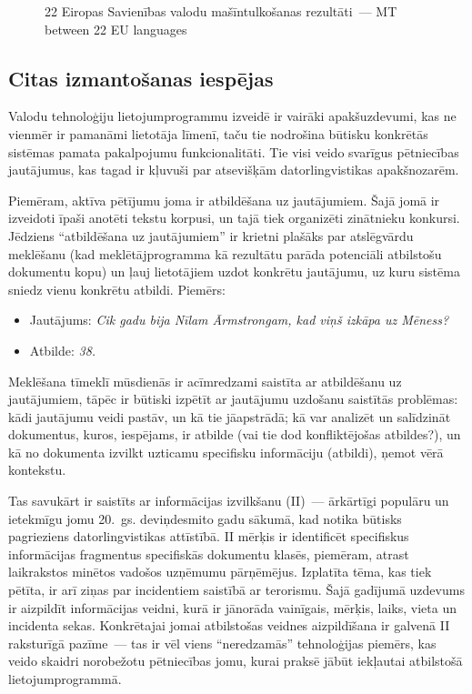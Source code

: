 \begin{multicols}{2}
\begin{figure}[htbp]
\begin{tabular}{>{\columncolor{corange1}}cccccccccccccccccccccccc}
    \end{tabular}
  \caption{22 Eiropas Savienības valodu mašīntulkošanas rezultāti~--- \textcolor{grey1}{MT between 22 EU languages}}
  \label{fig:euromatrix_po}
\end{figure}

\subsection{Citas izmantošanas iespējas}

Valodu tehnoloģiju lietojumprogrammu izveidē ir vairāki apakšuzdevumi, kas ne vienmēr ir pamanāmi lietotāja līmenī, taču tie nodrošina būtisku konkrētās sistēmas pamata pakalpojumu funkcionalitāti.
Tie visi veido svarīgus pētniecības jautājumus, kas tagad ir kļuvuši par atsevišķām datorlingvistikas apakš\-nozarēm. 

Piemēram, aktīva pētījumu joma ir atbildēšana uz jautājumiem.
Šajā jomā ir izveidoti īpaši anotēti tekstu korpusi, un tajā tiek organizēti zinātnieku konkursi. 
Jēdziens “atbildēšana uz jautājumiem” ir krietni plašāks par atslēgvārdu meklēšanu (kad meklētājprogramma kā rezultātu parāda potenciāli atbilstošu dokumentu kopu) un ļauj lietotājiem uzdot konkrētu jautājumu, uz kuru sistēma sniedz vienu konkrētu atbildi.
Piemērs:

\begin{itemize}
\item[] Jautājums: \textit{Cik gadu bija Nīlam Ārmstrongam, kad viņš izkāpa uz Mēness?}
\item[] Atbilde: \textit{38.}
\end{itemize}
Meklēšana tīmeklī mūsdienās ir acīmredzami saistīta ar atbildēšanu uz jautājumiem, tāpēc ir būtiski izpētīt ar jautājumu uzdošanu saistītās problēmas: kādi jautājumu veidi pastāv, un kā tie jāapstrādā; kā var analizēt un salīdzināt dokumentus, kuros, iespējams, ir atbilde (vai tie dod konfliktējošas atbildes?), un kā no dokumenta izvilkt uzticamu specifisku informāciju (atbildi), ņemot vērā kontekstu. 


Tas savukārt ir saistīts ar informācijas izvilkšanu (II)~--- ārkārtīgi populāru un ietekmīgu jomu 20.~gs. deviņdesmito gadu sākumā, kad notika būtisks pagrieziens datorlingvistikas attīstībā.
II mērķis ir identificēt specifiskus informācijas fragmentus specifiskās dokumentu klasēs, piemēram, atrast laikrakstos minētos vadošos uzņēmumu pārņēmējus.
Izplatīta tēma, kas tiek pētīta, ir arī ziņas par incidentiem saistībā ar terorismu.
Šajā gadījumā uzdevums ir aizpildīt informācijas veidni, kurā ir jānorāda vainīgais, mērķis, laiks, vieta un incidenta sekas.
Konkrētajai jomai atbilstošas veidnes aizpildīšana ir galvenā II raksturīgā pazīme~--- tas ir vēl viens “neredzamās” tehnoloģijas piemērs, kas veido skaidri norobežotu pētniecības jomu, kurai praksē jābūt iekļautai atbilstošā lietojumprogrammā. 


\end{multicols}
